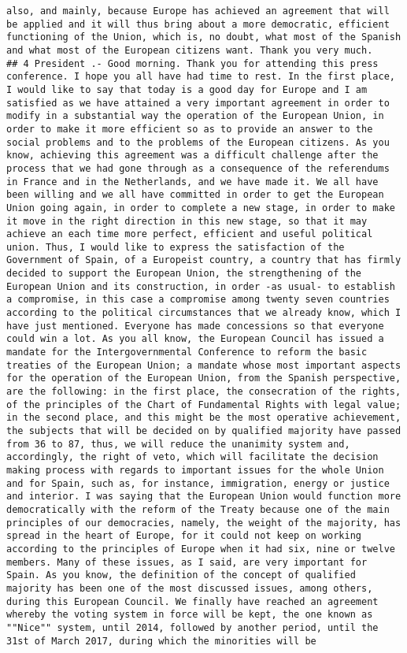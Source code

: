 \documentclass[
]{article}
\begin{document}
\begin{verbatim}
also, and mainly, because Europe has achieved an agreement that will be applied and it will thus bring about a more democratic, efficient functioning of the Union, which is, no doubt, what most of the Spanish and what most of the European citizens want. Thank you very much.
## 4 President .- Good morning. Thank you for attending this press conference. I hope you all have had time to rest. In the first place, I would like to say that today is a good day for Europe and I am satisfied as we have attained a very important agreement in order to modify in a substantial way the operation of the European Union, in order to make it more efficient so as to provide an answer to the social problems and to the problems of the European citizens. As you know, achieving this agreement was a difficult challenge after the process that we had gone through as a consequence of the referendums in France and in the Netherlands, and we have made it. We all have been willing and we all have committed in order to get the European Union going again, in order to complete a new stage, in order to make it move in the right direction in this new stage, so that it may achieve an each time more perfect, efficient and useful political union. Thus, I would like to express the satisfaction of the Government of Spain, of a Europeist country, a country that has firmly decided to support the European Union, the strengthening of the European Union and its construction, in order -as usual- to establish a compromise, in this case a compromise among twenty seven countries according to the political circumstances that we already know, which I have just mentioned. Everyone has made concessions so that everyone could win a lot. As you all know, the European Council has issued a mandate for the Intergovernmental Conference to reform the basic treaties of the European Union; a mandate whose most important aspects for the operation of the European Union, from the Spanish perspective, are the following: in the first place, the consecration of the rights, of the principles of the Chart of Fundamental Rights with legal value; in the second place, and this might be the most operative achievement, the subjects that will be decided on by qualified majority have passed from 36 to 87, thus, we will reduce the unanimity system and, accordingly, the right of veto, which will facilitate the decision making process with regards to important issues for the whole Union and for Spain, such as, for instance, immigration, energy or justice and interior. I was saying that the European Union would function more democratically with the reform of the Treaty because one of the main principles of our democracies, namely, the weight of the majority, has spread in the heart of Europe, for it could not keep on working according to the principles of Europe when it had six, nine or twelve members. Many of these issues, as I said, are very important for Spain. As you know, the definition of the concept of qualified majority has been one of the most discussed issues, among others, during this European Council. We finally have reached an agreement whereby the voting system in force will be kept, the one known as ""Nice"" system, until 2014, followed by another period, until the 31st of March 2017, during which the minorities will be 
\end{verbatim}
\end{document}
